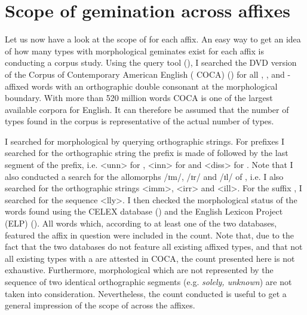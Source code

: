 \section{Scope of gemination across affixes} \label{scope of gemination}

Let us now have a look at the scope of  for each affix. An easy way to get an idea of how many types with morphological {geminates} exist for each affix is conducting a corpus study. Using the query tool  (\citealt{Kunter.2016}), I searched the DVD version of the {Corpus of Contemporary American English ( {COCA})} (\citealt{Davies.20082014}) for all , ,  and -affixed words with an orthographic double consonant at the morphological boundary. With more than 520 million words  {COCA} is one of the largest available corpora for English. It can therefore be assumed that the number of types found in the corpus is representative of the actual number of types.

I searched for morphological  by querying orthographic strings. For prefixes I searched for the orthographic string the prefix is made of followed by the last segment of the prefix, i.e. <unn> for ,  <inn> for  and  <diss> for . Note that I also conducted a search for the allomorphs /ɪm/, /ɪr/ and /ɪl/ of , i.e. I also searched for the orthographic strings  <imm>, <irr> and <ill>.  For the suffix , I searched for the sequence <lly>.  I then checked the morphological status of the words found using the {CELEX} database (\citealt{Baayen.1995}) and the {English Lexicon Project (ELP)} (\citealt{Balota.2007}). All words which, according to at least one of the two databases, featured the affix in question were included in the count. 
Note that, due to the fact that the two databases do not feature all existing affixed types, and that not all existing types with a  are attested in  {COCA}, the count presented here is not exhaustive. Furthermore, morphological  which are not represented by the sequence of two identical orthographic segments (e.g. \textit{solely, unknown}) are not taken into consideration. Nevertheless, the count conducted is useful to get a general impression of the scope of  across the affixes.
 
